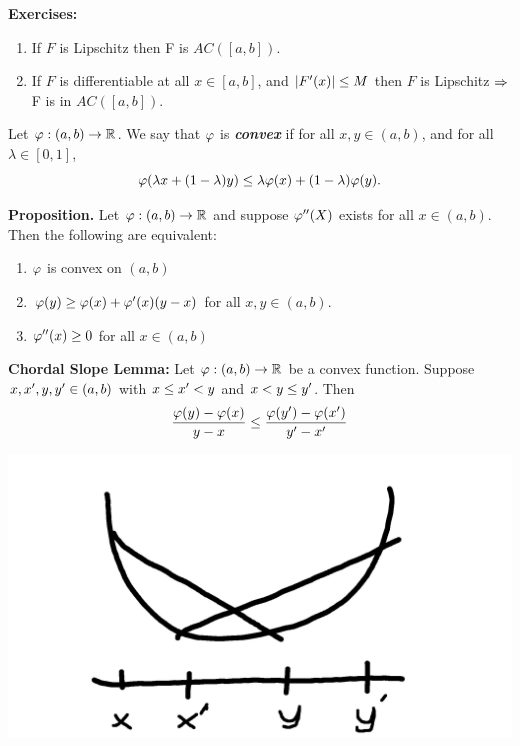 \textbf{Exercises:}
\begin{enumerate}
    \item If $F$ is Lipschitz then F is $AC([a,b])$.
    \item If $F$ is differentiable at all $x\in [a,b]$, and $|F^\prime(x)|\leq M$ then $F$ is Lipschitz $\Rightarrow$ F is in $AC([a,b])$.
\end{enumerate}

\vs

\dfn Let $\varphi:(a,b)\rightarrow \mathbb{R}$. We say that $\varphi$ is \textbf{\textit{convex}} if for all $x,y\in (a,b)$, and for all $\lambda \in [0,1]$, 
\[\varphi(\lambda x + (1-\lambda)y)\leq \lambda \varphi(x) + (1-\lambda)\varphi(y).\]

\vs


\textbf{Proposition.} Let $\varphi:(a,b)\rightarrow \mathbb{R}$ and suppose $\varphi^{\prime\prime}(X)$ exists for all $x\in (a,b)$. Then the following are equivalent:
\begin{enumerate}[\hspace{1em} (i)]
    \item $\varphi$ is convex on $(a,b)$
    \item $\varphi(y) \geq \varphi(x) + \varphi^\prime(x) (y - x)$ for all $x,y \in (a,b)$.
    \item $\varphi^{\prime\prime}(x) \geq 0$ for all $x\in (a,b)$
\end{enumerate}

\vs

\textbf{Chordal Slope Lemma:} Let $\varphi:(a,b) \rightarrow \mathbb{R}$ be a convex function. Suppose $x, x^\prime, y, y^\prime\in (a,b)$ with $x \leq x^\prime < y$ and $x < y \leq y^\prime$. Then 
\[\frac{\varphi(y) - \varphi(x)}{y - x}\leq \frac{\varphi(y^\prime) - \varphi(x^\prime)}{y^\prime - x^\prime}\]

\begin{center}
    \includegraphics[scale = 0.5]{chordal.png}
\end{center}


